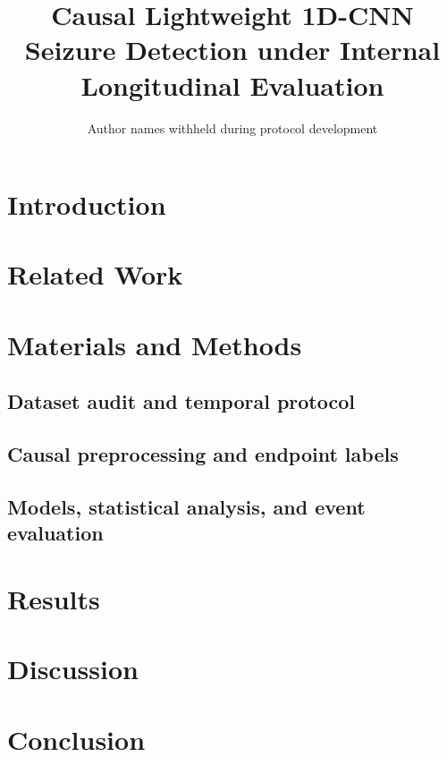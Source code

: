 \documentclass[pdflatex,sn-basic]{sn-jnl}
\begin{document}
\title{Causal Lightweight 1D-CNN Seizure Detection under Internal Longitudinal Evaluation}
\author*{Author names withheld during protocol development}
\maketitle
\section{Introduction}
\section{Related Work}
\section{Materials and Methods}
\subsection{Dataset audit and temporal protocol}
\subsection{Causal preprocessing and endpoint labels}
\subsection{Models, statistical analysis, and event evaluation}
\section{Results}
\section{Discussion}
\section{Conclusion}
\end{document}
